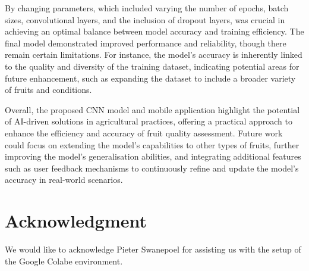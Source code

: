 \documentclass[conference]{IEEEtran}
\begin{document}
By changing parameters, which included varying the number of epochs, batch sizes, convolutional layers, and the inclusion of dropout layers, was crucial in achieving an optimal balance between model accuracy and training efficiency. The final model demonstrated improved performance and reliability, though there remain certain limitations. For instance, the model's accuracy is inherently linked to the quality and diversity of the training dataset, indicating potential areas for future enhancement, such as expanding the dataset to include a broader variety of fruits and conditions.

Overall, the proposed CNN model and mobile application highlight the potential of AI-driven solutions in agricultural practices, offering a practical approach to enhance the efficiency and accuracy of fruit quality assessment. Future work could focus on extending the model's capabilities to other types of fruits, further improving the model's generalisation abilities, and integrating additional features such as user feedback mechanisms to continuously refine and update the model's accuracy in real-world scenarios.

\section*{Acknowledgment}

We would like to acknowledge Pieter Swanepoel for assisting us with the setup of the Google Colabe environment. %
\end{document}
